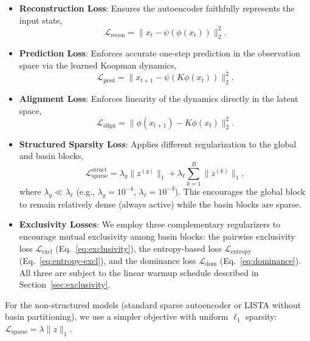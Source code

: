 \begin{itemize}
    \item \textbf{Reconstruction Loss}: Ensures the autoencoder faithfully represents the input state,
    \begin{equation}
        \mathcal{L}_{\text{recon}} = \|x_t - \psi(\phi(x_t))\|_2^2.
    \end{equation}

    \item \textbf{Prediction Loss}: Enforces accurate one-step prediction in the observation space via the learned Koopman dynamics,
    \begin{equation}
        \mathcal{L}_{\text{pred}} = \|x_{t+1} - \psi(K \phi(x_t))\|_2^2.
    \end{equation}

    \item \textbf{Alignment Loss}: Enforces linearity of the dynamics directly in the latent space,
    \begin{equation}
        \mathcal{L}_{\text{align}} = \|\phi(x_{t+1}) - K \phi(x_t)\|_2^2.
    \end{equation}

    \item \textbf{Structured Sparsity Loss}: Applies different regularization to the global and basin blocks,
    \begin{equation}
        \mathcal{L}_{\text{sparse}}^{\text{struct}} = \lambda_g \|z^{(g)}\|_1 + \lambda_\ell \sum_{k=1}^{B} \|z^{(k)}\|_1,
    \end{equation}
    where $\lambda_g \ll \lambda_\ell$ (e.g., $\lambda_g = 10^{-4}$, $\lambda_\ell = 10^{-3}$). This encourages the global block to remain relatively dense (always active) while the basin blocks are sparse.

    \item \textbf{Exclusivity Losses}: We employ three complementary regularizers to encourage mutual exclusivity among basin blocks: the pairwise exclusivity loss $\mathcal{L}_{\text{excl}}$ (Eq.~\ref{eq:exclusivity}), the entropy-based loss $\mathcal{L}_{\text{entropy}}$ (Eq.~\ref{eq:entropy-excl}), and the dominance loss $\mathcal{L}_{\text{dom}}$ (Eq.~\ref{eq:dominance}). All three are subject to the linear warmup schedule described in Section~\ref{sec:exclusivity}.
\end{itemize}

For the non-structured models (standard sparse autoencoder or LISTA without basin partitioning), we use a simpler objective with uniform $\ell_1$ sparsity: $\mathcal{L}_{\text{sparse}} = \lambda \|z\|_1$.


